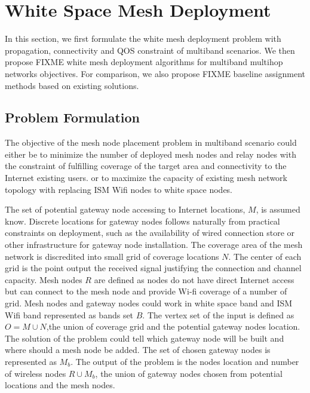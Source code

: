 \section{White Space Mesh Deployment}
\label{sec:model}

In this section, we first formulate the 
white mesh deployment problem
with propagation, connectivity and QOS constraint of multiband scenarios.
We then propose {FIXME} white mesh deployment algorithms for multiband multihop networks objectives.
For comparison, we also propose {FIXME} baseline assignment methods based on existing solutions.

\subsection{Problem Formulation}
The objective of the mesh node placement problem in multiband scenario could either be 
to minimize the number of deployed mesh nodes and relay nodes with the constraint of fulfilling coverage of the target area and connectivity to the Internet existing users. 
or to maximize the capacity of existing mesh network topology with replacing ISM Wifi nodes to white space nodes.

The set of potential gateway node accessing to Internet locations, $M$, is assumed know. 
Discrete locations for gateway nodes follows naturally from practical constraints on deployment, such as the availability of wired connection store or other infrastructure for gateway node installation.
The coverage area of the mesh network is discredited into small grid of coverage locations $N$. The center of each grid is the point output the received signal justifying the connection and channel capacity.
Mesh nodes $R$  are defined as nodes do not have direct Internet access but can connect to the mesh node and provide Wi-fi coverage of a number of grid.
Mesh nodes and gateway nodes could work in white space band and ISM Wifi band represented as bands set $B$.
The vertex set of the input is defined as $O=M\cup N$,the union of  coverage grid and the potential gateway nodes location. 
The solution of the problem could tell which gateway node will be built and where should a mesh node be added. The set of chosen gateway nodes is represented as $M_b$. 
The output of the problem is the nodes location and number of wireless nodes $R\cup M_b$, the union of gateway nodes chosen from potential locations and the mesh nodes. 


